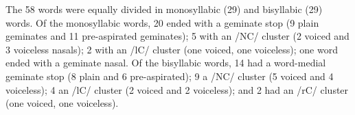 \documentclass[11pt,a4paper,openany]{memoir}\usepackage[]{graphicx}\usepackage[]{color}
\begin{document}
The 58 words were equally divided in monosyllabic (29) and bisyllabic (29) words.
Of the monosyllabic words, 20 ended with a geminate stop (9 plain geminates and 11 pre-aspirated geminates); 5 with an /NC/ cluster (2 voiced and 3 voiceless nasals); 2 with an /lC/ cluster (one voiced, one voiceless); one word ended with a geminate nasal.
Of the bisyllabic words, 14 had a word-medial geminate stop (8 plain and 6 pre-aspirated); 9 a /NC/ cluster (5 voiced and 4 voiceless); 4 an /lC/ cluster (2 voiced and 2 voiceless); and 2 had an /rC/ cluster (one voiced, one voiceless).


\vspace{2em}

\label{t:wordlist}
\end{document}
